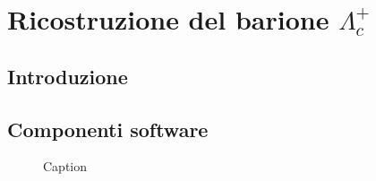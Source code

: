\chapter{Ricostruzione del barione $\Lambda^+_c$}

\section{Introduzione}

\section{Componenti software}











\begin{figure}[h]
    \centering
    
    \caption{Caption}
    \label{fig:enter-label}
\end{figure}